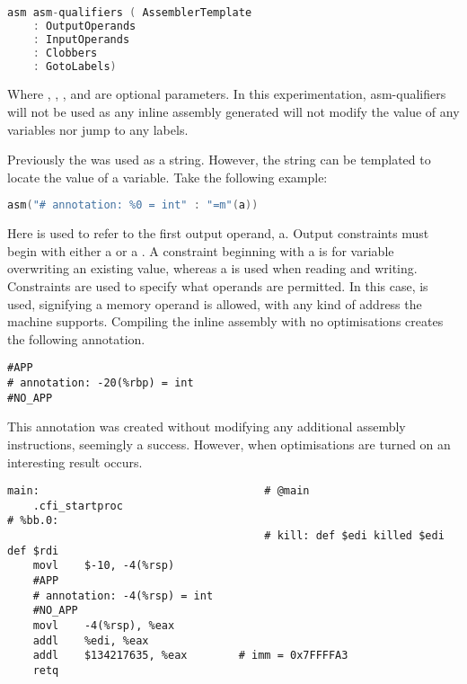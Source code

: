 \begin{lstlisting}[language=C, numbers=none]
asm asm-qualifiers ( AssemblerTemplate 
    : OutputOperands
    : InputOperands
    : Clobbers
    : GotoLabels)
\end{lstlisting}

Where , , ,  and  are optional parameters. In this experimentation, asm-qualifiers will not be used as any inline assembly generated will not modify the value of any variables nor jump to any labels.

Previously the  was used as a string. However, the string can be templated to locate the value of a variable. Take the following example:

\begin{lstlisting}[language=C, numbers=none]
asm("# annotation: %0 = int" : "=m"(a))
\end{lstlisting}

Here  is used to refer to the first output operand, a. Output constraints must begin with either a  or a . A constraint beginning with a  is for variable overwriting an existing value, whereas a  is used when reading and writing. Constraints are used to specify what operands are permitted. In this case,  is used, signifying a memory operand is allowed, with any kind of address the machine supports. Compiling the inline assembly with no optimisations creates the following annotation.

\begin{lstlisting}[firstnumber=30, caption=variable-O0.s]
#APP
# annotation: -20(%rbp) = int
#NO_APP
\end{lstlisting}

This annotation was created without modifying any additional assembly instructions, seemingly a success. However, when optimisations are turned on an interesting result occurs.

\begin{lstlisting}[firstnumber=6, caption=variable-O3.s, label=lst:inlineVariableOutputOperand]
main:                                   # @main
	.cfi_startproc
# %bb.0:
                                        # kill: def $edi killed $edi def $rdi
	movl	$-10, -4(%rsp)
	#APP
	# annotation: -4(%rsp) = int
	#NO_APP
	movl	-4(%rsp), %eax
	addl	%edi, %eax
	addl	$134217635, %eax        # imm = 0x7FFFFA3
	retq
\end{lstlisting}

